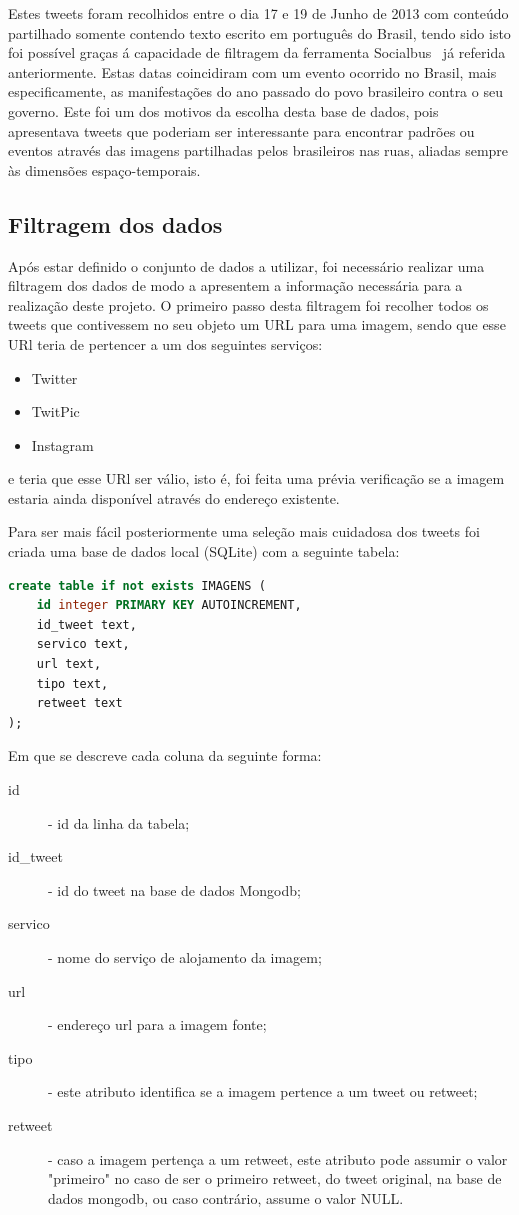 Estes tweets foram recolhidos entre o dia 17 e 19 de Junho de 2013 com conteúdo partilhado somente contendo texto escrito em português do Brasil, tendo sido isto foi possível graças á capacidade de filtragem da ferramenta Socialbus~\cite{Boanjak2012} já referida anteriormente. Estas datas coincidiram com um evento ocorrido no Brasil, mais especificamente, as manifestações do ano passado do povo brasileiro contra o seu governo. Este foi um dos motivos da escolha desta base de dados, pois apresentava tweets que poderiam ser interessante para encontrar padrões ou eventos através das imagens partilhadas pelos brasileiros nas ruas, aliadas sempre às dimensões espaço-temporais. 

\subsection{Filtragem dos dados}

Após estar definido o conjunto de dados a utilizar, foi necessário realizar uma filtragem dos dados de modo a apresentem a informação necessária para a realização deste projeto. O primeiro passo desta filtragem foi recolher todos os tweets que contivessem no seu objeto um URL para uma imagem, sendo que esse URl teria de pertencer a um dos seguintes serviços: 

\begin{itemize}
\item Twitter
\item TwitPic
\item Instagram
\end{itemize}

e teria que esse URl ser válio, isto é, foi feita uma prévia verificação se a imagem estaria ainda disponível através do endereço existente.

Para ser mais fácil posteriormente uma seleção mais cuidadosa dos tweets foi criada uma base de dados local (SQLite) com a seguinte tabela:

\begin{lstlisting}[language=SQL]
create table if not exists IMAGENS ( 
	id integer PRIMARY KEY AUTOINCREMENT, 
	id_tweet text, 
	servico text, 
	url text, 
	tipo text, 
	retweet text 
); 
\end{lstlisting}

Em que se descreve cada coluna da seguinte forma:

\begin{description}
\item[id] - id da linha da tabela;
\item[id\_tweet] - id do tweet na base de dados Mongodb;
\item[servico] - nome do serviço de alojamento da imagem;
\item[url] - endereço url para a imagem fonte;
\item[tipo] - este atributo identifica se a imagem pertence a um tweet ou retweet;
\item[retweet] - caso a imagem pertença a um retweet, este atributo pode assumir o valor "primeiro" no caso de ser o primeiro retweet, do tweet original, na base de dados mongodb, ou caso contrário, assume o valor NULL.
\end{description}

